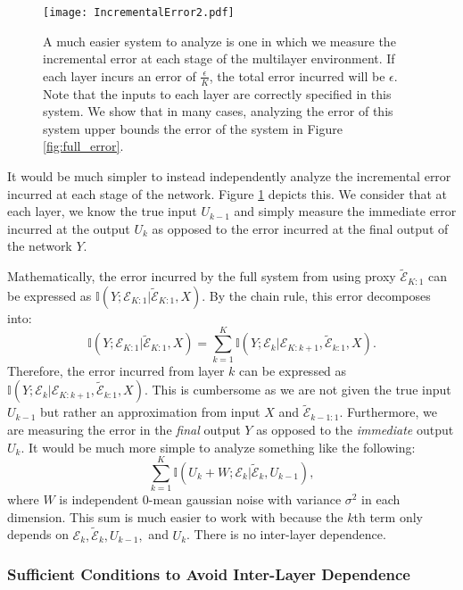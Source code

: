 \documentclass[twoside,11pt]{article}
\def\environment{\mathcal{E}}
\def\proxy{\tilde{\environment}}
\def\I{\mathbb{I}}
\begin{document}
\begin{figure}[!ht]
    \centering
    \texttt{[image: IncrementalError2.pdf]}
    \caption{A much easier system to analyze is one in which we measure the incremental error at each stage of the multilayer environment. If each layer incurs an error of $\frac{\epsilon}{K}$, the total error incurred will be $\epsilon$. Note that the inputs to each layer are correctly specified in this system. We show that in many cases, analyzing the error of this system upper bounds the error of the system in Figure \ref{fig:full_error}.}
    \label{fig:incremental_error}
\end{figure}

It would be much simpler to instead independently analyze the incremental error incurred at each stage of the network. Figure \ref{fig:incremental_error} depicts this. We consider that at each layer, we know the true input $U_{k-1}$ and simply measure the immediate error incurred at the output $U_k$ as opposed to the error incurred at the final output of the network $Y$.

Mathematically, the error incurred by the full system from using proxy $\proxy_{K:1}$ can be expressed as $\I(Y;\environment_{K:1}|\proxy_{K:1}, X)$. By the chain rule, this error decomposes into:
\begin{equation}
    \label{eq:full_error}
    \I(Y;\environment_{K:1}|\proxy_{K:1}, X) = \sum_{k=1}^{K}\I(Y;\environment_{k}|\environment_{K:k+1}, \proxy_{k:1}, X).
\end{equation}
Therefore, the error incurred from layer $k$ can be expressed as $\I(Y;\environment_{k}|\environment_{K:k+1}, \proxy_{k:1}, X)$. This is cumbersome as we are not given the true input $U_{k-1}$ but rather an approximation from input $X$ and $\proxy_{k-1:1}$. Furthermore, we are measuring the error in the \emph{final} output $Y$ as opposed to the \emph{immediate} output $U_k$. It would be much more simple to analyze something like the following:
\begin{equation}
    \label{eq:incremental_error}
    \sum_{k=1}^{K}\I(U_{k}+W;\environment_k|\proxy_k, U_{k-1}),
\end{equation}
where $W$ is independent $0$-mean gaussian noise with variance $\sigma^2$ in each dimension. This sum is much easier to work with because the $k$th term only depends on $\environment_k, \proxy_k, U_{k-1},$ and $U_k$. There is no inter-layer dependence.

\subsubsection{Sufficient Conditions to Avoid Inter-Layer Dependence}
\label{sec:suff_conds}
\end{document}
